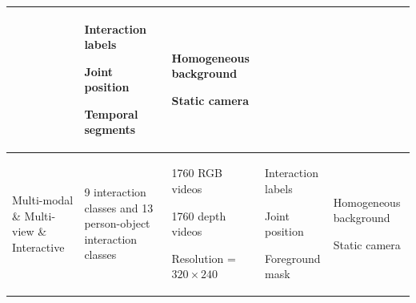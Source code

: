 \begin{table}
\begin{center}
\begin{tabular}{| p{2.5cm} | p{1.5cm} | p{4cm} | p{3cm} | p{3cm} |}
			& %
			\vspace{-5mm}
			\begin{myitemize}
				\item Interaction labels
				\item Joint position
				\item Temporal segments
			\end{myitemize}
			& %
			\vspace{-5mm}
			\begin{myitemize}
				\item Homogeneous background 
				\item Static camera
			\end{myitemize}
			\\ \hline
			
			Multi-modal \& Multi-view \& Interactive \cite{m2i_tju}
			& %
			9 interaction classes and 13 person-object interaction classes
			& %
			\vspace{-5mm}
			\begin{myitemize}
				\item 1760 RGB videos
				\item 1760 depth videos
				\item Resolution = \(320 \times 240\)
			\end{myitemize}
			
			& %
			\vspace{-5mm}
			\begin{myitemize}
				\item Interaction labels
				\item Joint position
				\item Foreground mask
			\end{myitemize}
			& %
			\vspace{-5mm}
			\begin{myitemize}
				\item Homogeneous background 
				\item Static camera
			\end{myitemize}
			\\ \hline
			
			
		\end{tabular}
		\label{table:interaction_datasets}
	\end{center}
\end{table}

